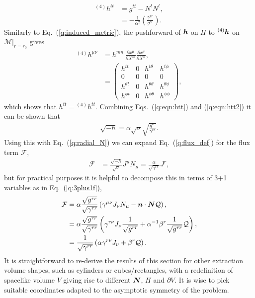 \begin{align}
{}^{(4)}h^{tt} &=      g^{tt} - N^t N^t, \\
\label{q:eqn:htt2}&= -\frac{1}{\alpha^2}\left(\frac{\gamma^{rr}}{g^{rr}} \right).
\end{align}
Similarly to Eq.~(\ref{q:induced_metric}), the pushforward of $\boldsymbol h$ on $H$ to ${}^{(4)}\boldsymbol h$ on $\mathcal{M}\vert_{r=r_0}$ gives
\begin{align}
{}^{(4)} h^{\mu\nu}  &= h^{mn}\,\frac{\partial x^\mu}{\partial X^m} \frac{\partial x^\nu}{\partial X^n}, \\
 &= \begin{pmatrix} h^{tt}&0&h^{t\theta }&h^{t\phi} \\ 0&0&0&0 \\ h^{\theta t}&0&h^{\theta \theta }&h^{\theta \phi} \\ h^{\phi t}&0&h^{\phi\theta }&h^{\phi\phi} \end{pmatrix},
\end{align}
which shows that $h^{tt}={}^{(4)}h^{tt}$. Combining Eqs.~(\ref{q:eqn:htt}) and (\ref{q:eqn:htt2}) it can be shown that
\begin{align}
     \label{q:rootminushexpand}\sqrt{-h} = \alpha \sqrt{\sigma} \sqrt{\frac{g^{rr}}{\gamma^{rr}}}.
\end{align}
Using this with Eq.~(\ref{q:radial_N}) we can expand Eq.~(\ref{q:flux_def}) for the flux term $\mathcal{F}$,
\begin{align}
 \label{q:spherical_flux}\mathcal{F}&=  \frac{\sqrt{-h}}{\sqrt{\sigma}} J^\mu N_\mu = \frac{\alpha}{\sqrt{\gamma^{rr}}} J^r,
 \end{align}
 but for practical purposes it is helpful to decompose this in terms of 3+1 variables as in Eq.~(\ref{q:3plus1f}),
 \begin{align}
   \mathcal{F} &= \alpha\frac{\sqrt{g^{rr}}}{\sqrt{\gamma^{rr}}} \left(\gamma^{\mu\nu}J_\nu {N}_\mu - \boldsymbol{n} \cdot \boldsymbol{N} \mathcal{Q}\right), \\
                   &=  \alpha\frac{\sqrt{g^{rr}}}{\sqrt{\gamma^{rr}}}\left(\gamma^{r\nu}J_\nu \frac{1}{\sqrt{g^{rr}}} +\alpha^{-1}\beta^r\frac{1}{\sqrt{g^{rr}}} \mathcal{Q}\right), \\
\label{q:3plus1fluxspherical}   &= \frac{1}{\sqrt{\gamma^{rr}}}\left(\alpha\gamma^{r\nu}J_\nu  + \beta^r \mathcal{Q}\right).
\end{align}
It is straightforward to re-derive the results of this section for other extraction volume shapes,
such as cylinders or cubes/rectangles, with a redefinition of spacelike volume $V$
giving rise to different $\boldsymbol{N}$, $H$ and $\partial V$. It is wise to pick suitable
coordinates adapted to the asymptotic symmetry of the problem.











